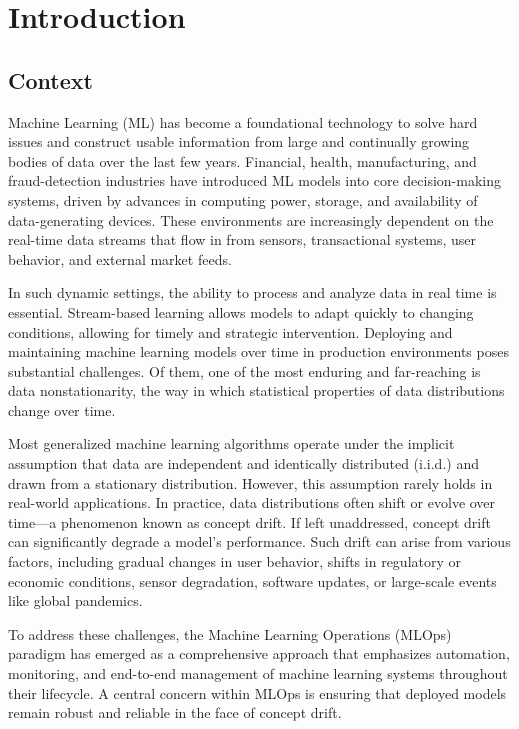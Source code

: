\chapter{Introduction}\label{ch:introduction}

\section{Context}\label{sec:context}
Machine Learning (ML) has become a foundational technology to solve hard issues
and construct usable information from large and continually growing bodies of
data over the last few years. Financial, health, manufacturing, and
fraud-detection industries have introduced ML models into core decision-making
systems, driven by advances in computing power, storage, and availability of
data-generating devices. These environments are increasingly dependent on the
real-time data streams that flow in from sensors, transactional systems, user
behavior, and external market feeds.

In such dynamic settings, the ability to process and analyze data in real time
is essential. Stream-based learning allows models to adapt quickly to changing
conditions, allowing for timely and strategic intervention. Deploying and
maintaining machine learning models over time in production environments poses
substantial challenges. Of them, one of the most enduring and far-reaching is
data nonstationarity, the way in which statistical properties of data
distributions change over time.

Most generalized machine learning algorithms operate under the implicit
assumption that data are independent and identically distributed (i.i.d.) and
drawn from a stationary distribution. However, this assumption rarely holds in
real-world applications. In practice, data distributions often shift or evolve
over time—a phenomenon known as concept drift. If left unaddressed, concept
drift can significantly degrade a model's performance. Such drift can arise
from various factors, including gradual changes in user behavior, shifts in
regulatory or economic conditions, sensor degradation, software updates, or
large-scale events like global pandemics.

To address these challenges, the Machine Learning Operations (MLOps)~\cite{mlops} paradigm
has emerged as a comprehensive approach that emphasizes automation, monitoring,
and end-to-end management of machine learning systems throughout their
lifecycle. A central concern within MLOps is ensuring that deployed models
remain robust and reliable in the face of concept drift.

